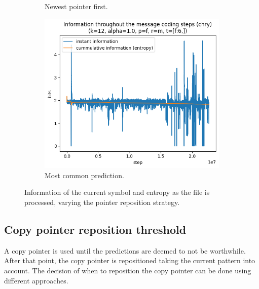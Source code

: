 \documentclass{article}
\begin{document}
\begin{figure}
\begin{subfigure}[b]{0.3\textwidth}
\begin{center}
        \end{center}
        \caption{Newest pointer first.}
        \label{fig:results-reposition-other-o}
    \end{subfigure}
    \hfill
    \begin{subfigure}[b]{0.3\textwidth}
        \begin{center}
            \includegraphics[width=1.0\linewidth]{../scripts/images/chry_12_1.0_f_m_[f:6,].png}
        \end{center}
        \caption{Most common prediction.}
        \label{fig:results-reposition-other-m}
    \end{subfigure}
    \caption{Information of the current symbol and entropy as the file is processed, varying the pointer reposition strategy.}
    \label{fig:results-reposition-other}
\end{figure}

\subsection{Copy pointer reposition threshold}

A copy pointer is used until the predictions are deemed to not be worthwhile.
After that point, the copy pointer is repositioned taking the current pattern into account.
The decision of when to reposition the copy pointer can be done using different approaches.
\end{document}
